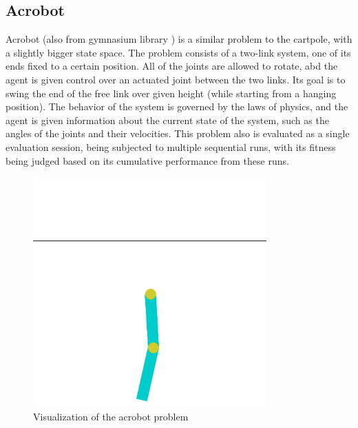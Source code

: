 \documentclass{article}
\begin{document}
        \subsection{Acrobot}
        Acrobot (also from gymnasium library \cite{gymnasium}) is a similar problem to the cartpole, with a slightly bigger state space. The problem consists
        of a two-link system, one of its ends fixed to a certain position. All of the joints are allowed to rotate,
        abd the agent is given control over an actuated joint between the two links. Its goal is to swing the
        end of the free link over given height (while starting from a hanging position). 
        The behavior of the system is governed by the laws of physics, and the agent is given information about the
        current state of the system, such as the angles of the joints and their velocities. 
        This problem also is evaluated as a single evaluation session, being subjected to multiple sequential runs,
        with its fitness being judged based on its cumulative performance from these runs.
    \begin{figure}[h]
        \centering
        \includegraphics[width=0.8\textwidth]{acrobot.png}
        \caption{Visualization of the acrobot problem}
    \end{figure}
\end{document}

